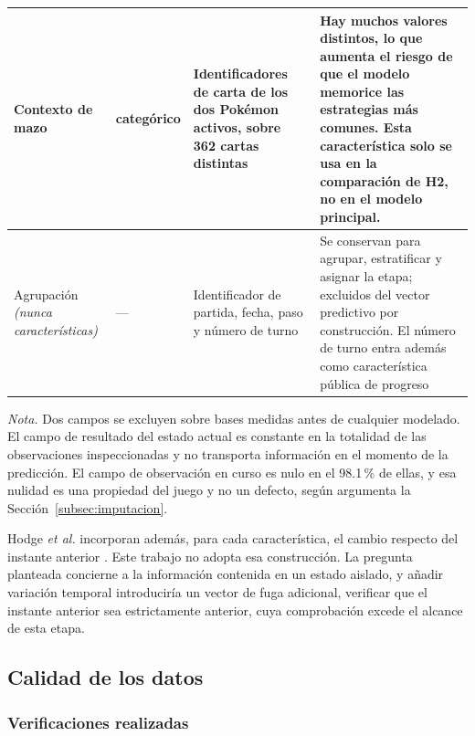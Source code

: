 \begin{table}[!t]
\begin{threeparttable}
\begin{tabularx}{\textwidth}{@{}
    P{2.2cm}
    >{\centering\arraybackslash}p{1.9cm}
    W{0.80}
    W{1.20}
  @{}}
Contexto de mazo & categórico &
Identificadores de carta de los dos Pok\'emon activos, sobre 362 cartas
distintas &
Hay muchos valores distintos, lo que aumenta el riesgo de que el modelo
memorice las estrategias más comunes. Esta característica solo se usa en la
comparación de H2, no en el modelo principal.
\\
\midrule

Agrupación \newline \textit{(nunca características)} & --- &
Identificador de partida, fecha, paso y número de turno &
Se conservan para agrupar, estratificar y asignar la etapa; excluidos del
vector predictivo por construcción. El número de turno entra además como
característica pública de progreso
\\

\bottomrule
\end{tabularx}
\begin{tablenotes}[flushleft]
\footnotesize
\item \textit{Nota.} Dos campos se excluyen sobre bases medidas antes de
cualquier modelado. El campo de resultado del estado actual es constante en
la totalidad de las observaciones inspeccionadas y no transporta información
en el momento de la predicción. El campo de observación en curso es nulo en
el 98.1\,\% de ellas, y esa nulidad es una propiedad del juego y no un
defecto, según argumenta la Sección~\ref{subsec:imputacion}.
\end{tablenotes}
\end{threeparttable}
\end{table}

Hodge \textit{et al.} incorporan además, para cada característica, el cambio
respecto del instante anterior \cite{hodge_winprediction_2021}. Este trabajo
no adopta esa construcción. La pregunta planteada concierne a la información
contenida en un estado aislado, y añadir variación temporal introduciría un
vector de fuga adicional, verificar que el instante anterior sea
estrictamente anterior, cuya comprobación excede el alcance de esta etapa.

\subsection{Calidad de los datos}
\label{subsec:calidad}

\subsubsection{Verificaciones realizadas}

